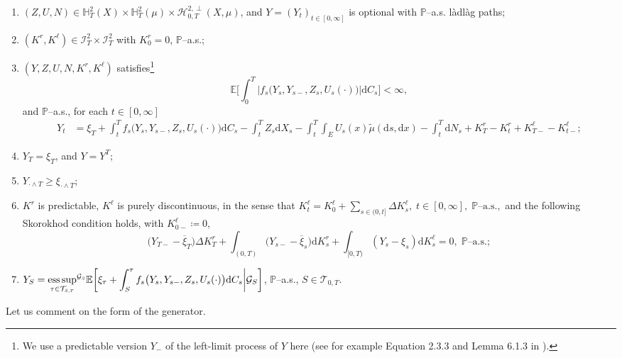 \documentclass[10pt]{article} %
\newcommand\cG{\mathcal G}
\newcommand\cH{\mathcal H}
\newcommand\cI{\mathcal I}
\newcommand\cT{\mathcal T}
\newcommand{\smalltext}[1]{\text{\fontsize{4}{4}\selectfont$#1$}}
\def \E{\mathbb{E}}
\def \H{\mathbb{H}}
\def \P{\mathbb{P}}
\def\d{\mathrm{d}}
\DeclareMathOperator*{\esssup}{ess\,sup}
\begin{document}
\begin{enumerate}[{\bf (R1)}, leftmargin=0.9cm]
	\item \label{cond::integ_mart}$(Z,U,N) \in \H^2_T(X) \times \H^2_T(\mu) \times \cH^{2,\perp}_{0,T}(X,\mu)$, and $Y = (Y_t)_{t \in [0,\infty]}$ is optional with $\P$--a.s. l\`adl\`ag paths;
	\item \label{cond::integ_y_and_k} $(K^r,K^\ell) \in \cI^2_T \times  \cI^2_T$ with $K^r_0 = 0$, $\P$--a.s.;
	\item \label{cond::refl_eq} $(Y,Z,U,N,K^r,K^\ell)$ satisfies\footnote{We use a predictable version $Y_-$ of the left-limit process of $Y$ here (see for example Equation 2.3.3 and Lemma 6.1.3 in \cite{weizsaecker1990stochastic}).}
		\begin{equation*}
			\E\bigg[\int_0^T \big|f_s\big(Y_s,Y_{s-},Z_s,U_s(\cdot)\big)\big|\d C_s\bigg] < \infty,
		\end{equation*}
	and $\P$--a.s., for each $t \in [0,\infty]$
		\begin{align*}
			Y_t &= \xi_T + \int_t^T f_s\big(Y_s,Y_{s-},Z_s,U_s(\cdot)\big) \d C_s - \int_t^T Z_s \d X_s - \int_t^T\int_E U_s(x)\tilde\mu(\d s, \d x) - \int_t^T\d N_s+ K^r_T - K^r_t + K^{\ell}_{T-} - K^{\ell}_{t-};
		\end{align*}
	\item \label{cond::y_equals_xi}$Y_T = \xi_T$, and $Y = Y^T$;
	\item \label{cond::y_greater_xi}$Y_{\cdot \land T} \geq \xi_{\cdot \land T}$;
	\item \label{cond::increasing_proc} $K^r$ is predictable, $K^\ell$ is purely discontinuous, in the sense that $K^\ell_t = K^\ell_0 + \sum_{s \in (0,t] } \Delta K^\ell_s, \; t \in [0,\infty], \; \text{$\P$--a.s.},$
		 and the following Skorokhod condition holds, with $K^\ell_{0-} \coloneqq 0$,
		\[
		 \big(Y_{T-} - \overline{\xi}_T\big) \Delta K^r_T + \int_{(0,T)} \big(Y_{s-} - \overline{\xi}_s\big) \d K^r_s + \int_{[0,T)} (Y_s - \xi_s) \d K^\ell_s = 0, \;\text{$\P$--a.s.};
		\]
	
	\item \label{cond::repre_Y} $\displaystyle Y_S = {\esssup_{\tau \in \cT_{\smalltext{S}\smalltext{,}\smalltext{T}}}}^{\cG_\smalltext{S}} \E\bigg[ \xi_\tau + \int_S^\tau f_s\big(Y_s,Y_{s-},Z_s,U_s(\cdot)\big) \d C_s \bigg| \cG_S\bigg]$, $\P$--a.s., $S \in \cT_{0,T}$.
\end{enumerate}

Let us comment on the form of the generator.
\end{document}
